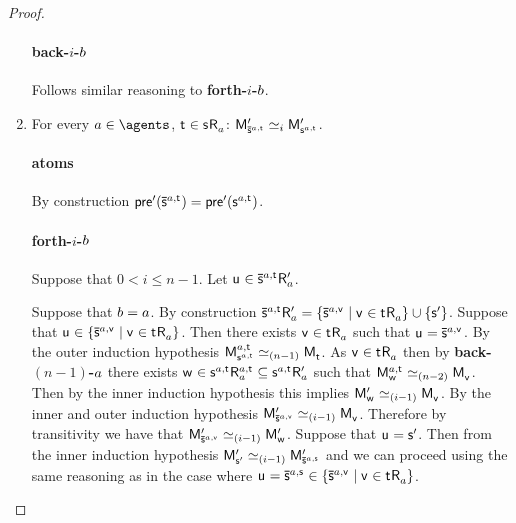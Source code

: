 \begin{proof}
\begin{enumerate}
            \paragraph{back-$i$-$b$} Follows similar reasoning to {\bf forth-$i$-$b$}.

        \item 
            For every $\agentA \in \agents$, $\aStateT \in \aStateS \aAccessibility{\agentA}$: $\aPModel[\prime]{\aPStateS[\agentA,\aStateT]} \bisimilar[i] \aPModel[\prime]{\aStateS[\agentA,\aStateT]}$.

            \paragraph{atoms} By construction $\aPrecondition[\prime](\aPStateS[\agentA,\aStateT]) = \aPrecondition[\prime](\aStateS[\agentA,\aStateT])$.

            \paragraph{forth-$i$-$b$} Suppose that $0 < i \leq n - 1$. Let $\aStateU \in \aPStateS[\agentA,\aStateT] \aAccessibility[\prime]{\agentA}$. 

            Suppose that $b = a$.
            By construction $\aPStateS[\agentA,\aStateT] \aAccessibility[\prime]{\agentA} = \{\aPStateS[\agentA,\aStateV] \mid \aStateV \in \aStateT \aAccessibility{\agentA}\} \cup \{\aStateS[\prime]\}$. 
            Suppose that $\aStateU \in \{\aPStateS[\agentA,\aStateV] \mid \aStateV \in \aStateT \aAccessibility{\agentA}\}$.
            Then there exists $\aStateV \in \aStateT \aAccessibility{\agentA}$ such that $\aStateU = \aPStateS[\agentA,\aStateV]$.
            By the outer induction hypothesis $\aPModel[\agentA,\aStateT]{\aStateS[\agentA,\aStateT]} \bisimilar[(n - 1)] \aPModel{\aStateT}$.
            As $\aStateV \in \aStateT \aAccessibility{\agentA}$ then by {\bf back-$(n-1)$-$a$} there exists $\aStateW \in \aStateS[\agentA,\aStateT] \aAccessibility[\agentA,\aStateT]{\agentA} \subseteq \aStateS[\agentA,\aStateT] \aAccessibility[\prime]{\agentA}$ such that $\aPModel[\agentA,\aStateT]{\aStateW} \bisimilar[(n - 2)] \aPModel{\aStateV}$.
            Then by the inner induction hypothesis this implies $\aPModel[\prime]{\aStateW} \bisimilar[(i - 1)] \aPModel{\aStateV}$.
            By the inner and outer induction hypothesis $\aPModel[\prime]{\aPStateS[\agentA,\aStateV]} \bisimilar[(i - 1)] \aPModel{\aStateV}$.
            Therefore by transitivity we have that $\aPModel[\prime]{\aPStateS[\agentA,\aStateV]} \bisimilar[(i - 1)] \aPModel[\prime]{\aStateW}$.
            Suppose that $\aStateU = \aStateS[\prime]$. 
            Then from the inner induction hypothesis $\aPModel[\prime]{\aStateS[\prime]} \bisimilar[(i - 1)] \aPModel[\prime]{\aPStateS[\agentA,\aStateS]}$ and we can proceed using the same reasoning as in the case where $\aStateU = \aPStateS[\agentA,\aStateS] \in \{\aPStateS[\agentA,\aStateV] \mid \aStateV \in \aStateT \aAccessibility{\agentA}\}$.


\end{enumerate}
\end{proof}
